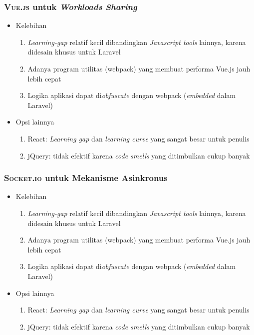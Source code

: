 	\subsubsection{\textsc{Vue.js} untuk \textit{Workloads Sharing}}
		\begin{itemize}
			\item Kelebihan
			\begin{enumerate}
				\item \textit{Learning-gap} relatif kecil dibandingkan \textit{Javascript tools} lainnya, karena didesain khusus untuk Laravel
				\item Adanya program utilitas (webpack) yang membuat performa Vue.js jauh lebih cepat
				\item Logika aplikasi dapat di\textit{obfuscate} dengan webpack (\textit{embedded} dalam Laravel)
			\end{enumerate}
			\item Opsi lainnya
			\begin{enumerate}
				\item React:  \textit{Learning gap} dan \textit{learning curve} yang sangat besar untuk penulis
				\item jQuery:  tidak efektif karena \textit{code smells} yang ditimbulkan cukup banyak
			\end{enumerate}
		\end{itemize}
		
	\subsubsection{\textsc{Socket.io} untuk Mekanisme Asinkronus}
		\begin{itemize}
			\item Kelebihan
			\begin{enumerate}
				\item \textit{Learning-gap} relatif kecil dibandingkan \textit{Javascript tools} lainnya, karena didesain khusus untuk Laravel
				\item Adanya program utilitas (webpack) yang membuat performa Vue.js jauh lebih cepat
				\item Logika aplikasi dapat di\textit{obfuscate} dengan webpack (\textit{embedded} dalam Laravel)
			\end{enumerate}
			\item Opsi lainnya
			\begin{enumerate}
				\item React:  \textit{Learning gap} dan \textit{learning curve} yang sangat besar untuk penulis
				\item jQuery:  tidak efektif karena \textit{code smells} yang ditimbulkan cukup banyak
			\end{enumerate}
		\end{itemize}		
		

